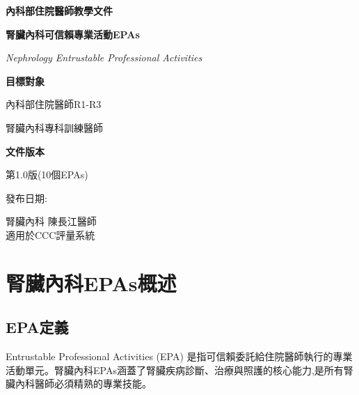 \documentclass[12pt,a4paper]{article}
\newcommand{\mydate}{\DTMtoday}
\begin{document}
\begin{titlepage}
    \centering
    {\LARGE\textcolor{nephro_blue}{\textbf{內科部住院醫師教學文件}}\par}
    \vspace{1cm}
    {\huge\bfseries 腎臟內科可信賴專業活動EPAs\par}
    \vspace{0.5cm}
    {\Large\textcolor{nephro_cyan}{\textit{Nephrology Entrustable Professional Activities}}\par}
    \vspace{1cm}
    
    \begin{tcolorbox}[
        colback=nephro_cyan!5!white,
        colframe=nephro_cyan,
        width=0.8\textwidth,
        arc=10pt,
        boxrule=1pt
    ]
    \centering
    {\large\textbf{目標對象}\par}
    \vspace{0.3cm}
    內科部住院醫師R1-R3\par
    腎臟內科專科訓練醫師\par
    \vspace{0.5cm}
    {\large\textbf{文件版本}\par}
    \vspace{0.3cm}
    第1.0版(10個EPAs)\par
    發布日期:\mydate\par
    \end{tcolorbox}

    \vfill
    
    {\large 腎臟內科 陳長江醫師\\
    適用於CCC評量系統\par}
    
    \vspace{0.5cm}
\end{titlepage}

\newpage
\tableofcontents
\newpage

\section{腎臟內科EPAs概述}

\subsection{EPA定義}
Entrustable Professional Activities (EPA) 是指可信賴委託給住院醫師執行的專業活動單元。腎臟內科EPAs涵蓋了腎臟疾病診斷、治療與照護的核心能力,是所有腎臟內科醫師必須精熟的專業技能。
\end{document}
